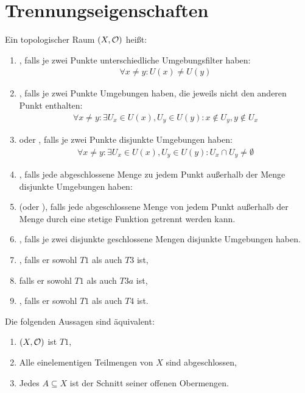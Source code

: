 \documentclass{report}
\begin{document}
\chapter{Trennungseigenschaften}
\begin{definition}
	Ein topologischer Raum $(X, \mathcal{O})$ heißt:
	\begin{enumerate}
		\item {}, falls je zwei Punkte unterschiedliche Umgebungsfilter haben:
		\begin{align*}
			\forall x \neq y : U(x) \neq U(y)
		\end{align*}
		\item {}, falls je zwei Punkte Umgebungen haben, die jeweils nicht den anderen Punkt enthalten:
		\begin{align*}
			\forall x \neq y : \exists U_x \in U(x), U_y \in U(y) : x \notin U_y, y \notin U_x
		\end{align*}
		\item {} oder , falls je zwei Punkte disjunkte Umgebungen haben:
		\begin{align*}
			\forall x \neq y : \exists U_x \in U(x), U_y \in U(y) : U_x \cap U_y \neq \emptyset
		\end{align*}
		\item {}, falls jede abgeschlossene Menge zu jedem Punkt außerhalb der Menge disjunkte Umgebungen haben:
		\item {} (oder ), falls jede abgeschlossene Menge von jedem Punkt außerhalb der Menge durch eine stetige Funktion getrennt werden kann.
		\item {}, falls je zwei disjunkte geschlossene Mengen disjunkte Umgebungen haben.
		\item {}, falls er sowohl $T1$ als auch $T3$ ist,
		\item {} falls er sowohl $T1$ als auch $T3a$ ist,
		\item {}, falls er sowohl $T1$ als auch $T4$ ist.
	\end{enumerate}
\end{definition}
\begin{theorem}
	Die folgenden Aussagen sind äquivalent:
	\begin{enumerate}
		\item $(X, \mathcal{O})$ ist $T1$,
		\item Alle einelementigen Teilmengen von $X$ sind abgeschlossen,
		\item Jedes $A \subseteq X$ ist der Schnitt seiner offenen Obermengen.
	\end{enumerate}
\end{theorem}
\end{document}
